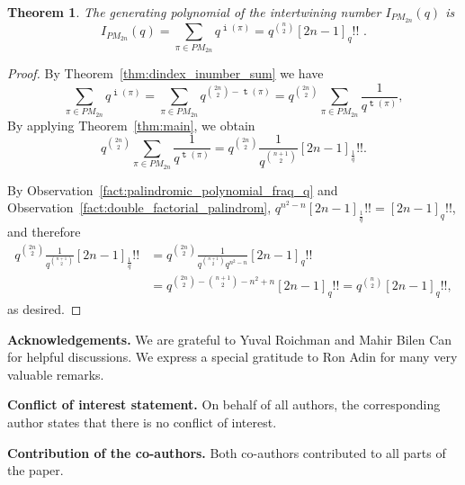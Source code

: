 \documentclass[11pt]{amsart}
\numberwithin{figure}{section}
\DeclareMathOperator{\inumber}{\mathtt i}
\DeclareMathOperator{\dindex}{\mathtt t}
\theoremstyle{plain}
\newtheorem{theorem}{Theorem}[section]
\theoremstyle{definition}
\begin{document}
\begin{theorem}\label{mainitnnn}
The generating polynomial of the intertwining number $I_{PM_{2n}}(q)$ is
$$I_{PM_{2n} }(q) = \sum_{\pi\in PM_{2n} }q^{\inumber(\pi) }=q^{\binom{n}{2}}[2n-1]_q!!\,\,.
$$
\end{theorem}

\begin{proof}
By Theorem~\ref{thm:dindex_inumber_sum} we have
$$\sum_{\pi\in PM_{2n} }q^{\inumber(\pi)}
=\sum_{\pi\in PM_{2n} } q^{\binom{2n}{2} - \dindex(\pi)}
=q^{\binom{2n}{2}} \sum_{\pi\in PM_{2n} } \frac{1}{q^{\dindex(\pi)} },
$$
By applying Theorem~\ref{thm:main}, we obtain
$$q^{\binom{2n}{2}} \sum_{\pi\in PM_{2n} } \frac{1}{q^{\dindex(\pi)} } =
q^{\binom{2n}{2}}\frac{1}{q^{\binom{n+1}{2} } }[2n-1]_{\frac{1}{q} }!!.
$$

By Observation~\ref{fact:palindromic_polynomial_fraq_q} and Observation~\ref{fact:double_factorial_palindrom}, 
$q^{n^2 - n}[2n-1]_{\frac{1}{q} }!!=[2n-1]_q!!$, and therefore 
\begin{align*}
    q^{\binom{2n}{2}}\frac{1}{q^{\binom{n+1}{2} } }[2n-1]_{\frac{1}{q} }!! &= 
    q^{\binom{2n}{2}}\frac{1}{q^{\binom{n+1}{2} }q^{n^2-n} }[2n-1]_q!! \\ &=
    q^{\binom{2n}{2} - \binom{n+1}{2} - n^2 + n}[2n-1]_q!!=q^{\binom{n}{2} }[2n-1]_q!!,
\end{align*}
as desired.
\end{proof}

{\bf Acknowledgements.} We are grateful to Yuval Roichman and Mahir Bilen Can for helpful discussions. We express a special gratitude to Ron Adin for many very valuable remarks. 

{\bf Conflict of interest statement.} On behalf of all authors, the corresponding author states that there is no conflict of interest.

{\bf Contribution of the co-authors.} Both co-authors contributed to all parts of the paper. 
\end{document}
